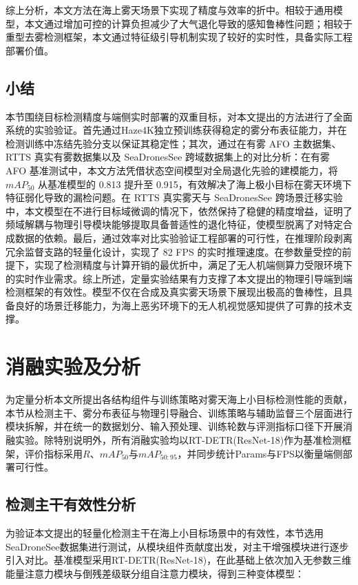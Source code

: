 综上分析，本文方法在海上雾天场景下实现了精度与效率的折中。相较于通用模型，本文通过增加可控的计算负担减少了大气退化导致的感知鲁棒性问题；相较于重型去雾检测框架，本文通过特征级引导机制实现了较好的实时性，具备实际工程部署价值。

\subsection{小结}
\label{subsec:cmp_summary}

本节围绕目标检测精度与端侧实时部署的双重目标，对本文提出的方法进行了全面系统的实验验证。首先通过Haze4K独立预训练获得稳定的雾分布表征能力，并在检测训练中冻结先验分支以保证其稳定性；其次，通过在有雾 AFO 主数据集、RTTS 真实有雾数据集以及 SeaDronesSee 跨域数据集上的对比分析：在有雾 AFO 基准测试中，本文方法凭借状态空间模型对全局退化先验的建模能力，将 $mAP_{50}$ 从基准模型的 0.813 提升至 0.915，有效解决了海上极小目标在雾天环境下特征弱化导致的漏检问题。在 RTTS 真实雾天与 SeaDronesSee 跨场景迁移实验中，本文模型在不进行目标域微调的情况下，依然保持了稳健的精度增益，证明了频域解耦与物理引导模块能够提取具备普适性的退化特征，使模型脱离了对特定合成数据的依赖。最后，通过效率对比实验验证工程部署的可行性，在推理阶段剥离冗余监督支路的轻量化设计，实现了 82 FPS 的实时推理速度。在参数量受控的前提下，实现了检测精度与计算开销的最优折中，满足了无人机端侧算力受限环境下的实时作业需求。综上所述，定量实验结果有力支撑了本文提出的物理引导端到端检测框架的有效性。模型不仅在合成及真实雾天场景下展现出极高的鲁棒性，且具备良好的场景迁移能力，为海上恶劣环境下的无人机视觉感知提供了可靠的技术支撑。

\section{消融实验及分析}
\label{sec:ablation}

为定量分析本文所提出各结构组件与训练策略对雾天海上小目标检测性能的贡献，本节从检测主干、雾分布表征与物理引导融合、训练策略与辅助监督三个层面进行模块拆解，并在统一的数据划分、输入预处理、训练轮数与评测指标口径下开展消融实验。除特别说明外，所有消融实验均以RT-DETR(ResNet-18)作为基准检测框架，评价指标采用$R$、$mAP_{50}$与$mAP_{50:95}$，并同步统计Params与FPS以衡量端侧部署可行性。

\subsection{检测主干有效性分析}
\label{subsec:ablation_backbone}

为验证本文提出的轻量化检测主干在海上小目标场景中的有效性，本节选用SeaDroneSee数据集进行测试，从模块组件贡献度出发，对主干增强模块进行逐步引入对比。基准模型采用RT-DETR(ResNet-18)，在此基础上依次加入无参数三维能量注意力模块与倒残差级联分组自注意力模块，得到三种变体模型：

